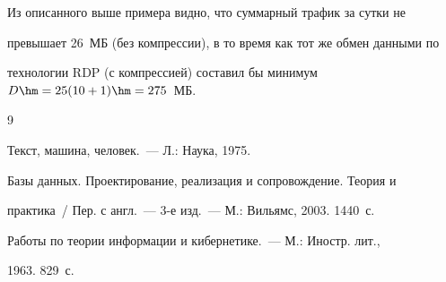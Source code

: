   


  Из описанного выше примера видно, что суммарный трафик за сутки не 


превышает 26~МБ (без компрессии), в то время как тот же обмен данными по 


технологии {RDP} (с компрессией) составил бы минимум $D \hm= 


25 (10 + 1) \hm= 275$~МБ. 


    


{\small\frenchspacing


{%




\begin{thebibliography}{9}









Текст, машина, человек.~--- Л.: Наука, 1975.









Базы данных. Проектирование, реализация и сопровождение. Теория и 


практика~/ Пер. с англ.~--- 3-е изд.~--- М.: Вильямс, 2003. 1440~с.





\label{end\stat}









Работы по теории информации и кибернетике.~--- М.: Иностр. лит., 


1963. 829~с.


 \end{thebibliography}


}


}    


